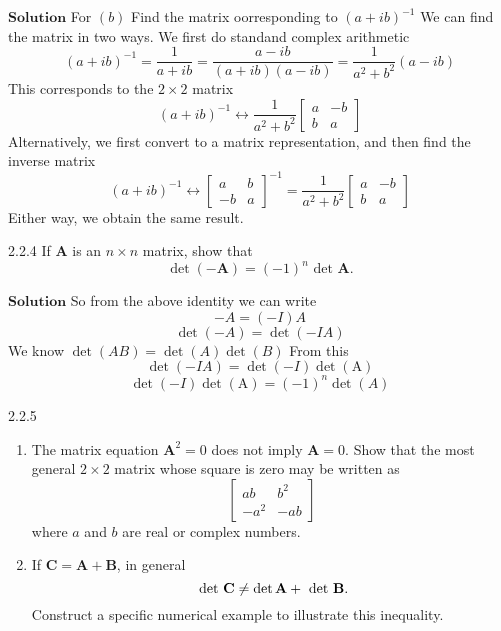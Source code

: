 \documentclass{article}
\begin{document}
\begin{flushleft}
$\boxed{\textbf{Solution}}$  For $(b)$ Find the matrix oorresponding to $(a+i b)^{-1}$ We can find the matrix in two ways. We first do standand complex arithmetic
$$
(a+i b)^{-1}=\frac{1}{a+i b}=\frac{a-i b}{(a+i b)(a-i b)}=\frac{1}{a^{2}+b^{2}}(a-i b)
$$
This corresponds to the $2 \times 2$ matrix
$$
(a+i b)^{-1} \longleftrightarrow \frac{1}{a^{2}+b^{2}}\begin{bmatrix}{a} & {-b} \\ {b} & {a}\end{bmatrix}
$$
Alternatively, we first convert to a matrix representation, and then find the inverse
matrix
$$
(a+i b)^{-1} \leftrightarrow\begin{bmatrix}{a} & {b} \\ {-b} & {a}\end{bmatrix}^{-1}=\frac{1}{a^{2}+b^{2}}\begin{bmatrix}{a} & {-b} \\ {b} & {a}\end{bmatrix}
$$
Either way, we obtain the same result.



\newpage

\begin{mybox}{2.2.4}
If $\mathbf{A}$ is an $n \times n$ matrix, show that
$$
\operatorname{det}(-\mathbf{A})=(-1)^{n} \text { det } \mathbf{A}.
$$
\end{mybox}




$\boxed{\textbf{Solution}}$ 
So from the above identity we can write
$$-A=(-I) A$$
$$\operatorname{det}(-A)=\operatorname{det}(-I A)$$
We know $\operatorname{det}(A B)=\operatorname{det}(A) \operatorname{det}(B)$
From this
$$\operatorname{det}(-I A)=\operatorname{det}(-I) \operatorname{det}(\mathrm{A})$$
$$\operatorname{det}(-I) \operatorname{det}(\mathrm{A})=(-1)^{n} \operatorname{det}(A)$$


\newpage

\begin{mybox}{2.2.5}
\begin{enumerate}[$(a)$]
\item The matrix equation $\mathbf{A}^{2}=0$ does not imply $\mathbf{A}=0 .$ Show that the most general
$2 \times 2$ matrix whose square is zero may be written as
$$
\begin{bmatrix}{a b} & {b^{2}} \\ {-a^{2}} & {-a b}\end{bmatrix}
$$
where $a$ and $b$ are real or complex numbers.
\item If $\mathbf{C}=\mathbf{A}+\mathbf{B}$, in general
$$
\text { det } \mathbf{C}\neq \operatorname{det} \mathbf{A}+\text { det } \mathbf{B} \text.
$$
Construct a specific numerical example to illustrate this inequality.
\end{enumerate}
\end{mybox}



\end{flushleft}
\end{document}
